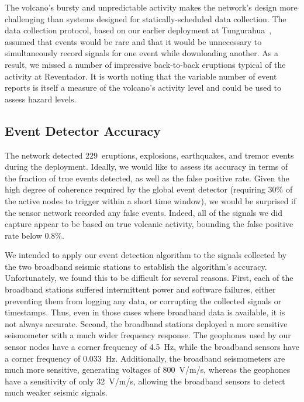The volcano's bursty and unpredictable activity makes the network's design
more challenging than systems designed for statically-scheduled data
collection. The data collection protocol, based on our earlier deployment at
Tungurahua~\cite{volcano-ewsn05}, assumed that events would be rare and that
it would be unnecessary to simultaneously record signals for one event while
downloading another. As a result, we missed a number of impressive
back-to-back eruptions typical of the activity at Reventador. It is worth
noting that the variable number of event reports is itself a measure of the
volcano's activity level and could be used to assess hazard levels.

\subsection{Event Detector Accuracy}
\label{sec-eventdetectaccuracy}

The network detected 229~eruptions, explosions, earthquakes, and tremor
events during the deployment. Ideally, we would like to assess its accuracy
in terms of the fraction of true events detected, as well as the false
positive rate. Given the high degree of coherence required by the global
event detector (requiring 30\% of the active nodes to trigger within a short
time window), we would be surprised if the sensor network recorded any false
events. Indeed, all of the signals we did capture appear to be based on true
volcanic activity, bounding the false positive rate below 0.8\%.

We intended to apply our event detection algorithm to the signals collected
by the two broadband seismic stations to establish the algorithm's accuracy.
Unfortunately, we found this to be difficult for several reasons. First, each
of the broadband stations suffered intermittent power and software failures,
either preventing them from logging any data, or corrupting the collected
signals or timestamps. Thus, even in those cases where broadband data is
available, it is not always accurate. Second, the broadband stations deployed
a more sensitive seismometer with a much wider frequency response. The
geophones used by our sensor nodes have a corner frequency of 4.5~Hz, while
the broadband sensors have a corner frequency of 0.033~Hz. Additionally, the
broadband seismometers are much more sensitive, generating voltages of
800~V/m/s, whereas the geophones have a sensitivity of only 32~V/m/s,
allowing the broadband sensors to detect much weaker seismic signals.

